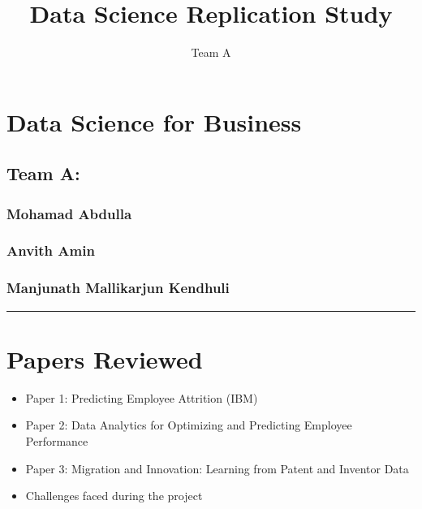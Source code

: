 \documentclass[
  letterpaper,
  DIV=11,
  numbers=noendperiod]{scrartcl}
\title{Data Science Replication Study}
\author{Team A}
\date{}
\providecommand{\tightlist}{%
  \setlength{\itemsep}{0pt}\setlength{\parskip}{0pt}}
\renewcommand*\contentsname{Table of contents}
\newcommand\contentsname{Table of contents}
\begin{document}
\maketitle

\renewcommand*\contentsname{Table of contents}
{
\hypersetup{linkcolor=}
\setcounter{tocdepth}{3}
\tableofcontents
}

\section{Data Science for Business}\label{data-science-for-business}

\subsection{Team A:}\label{team-a}

\subsubsection{Mohamad Abdulla}\label{mohamad-abdulla}

\subsubsection{Anvith Amin}\label{anvith-amin}

\subsubsection{Manjunath Mallikarjun
Kendhuli}\label{manjunath-mallikarjun-kendhuli}

\begin{center}\rule{0.5\linewidth}{0.5pt}\end{center}

\section{Papers Reviewed}\label{papers-reviewed}

\begin{itemize}
\tightlist
\item
  Paper 1: Predicting Employee Attrition (IBM)
\item
  Paper 2: Data Analytics for Optimizing and Predicting Employee
  Performance
\item
  Paper 3: Migration and Innovation: Learning from Patent and Inventor
  Data
\item
  Challenges faced during the project
\end{itemize}
\end{document}
